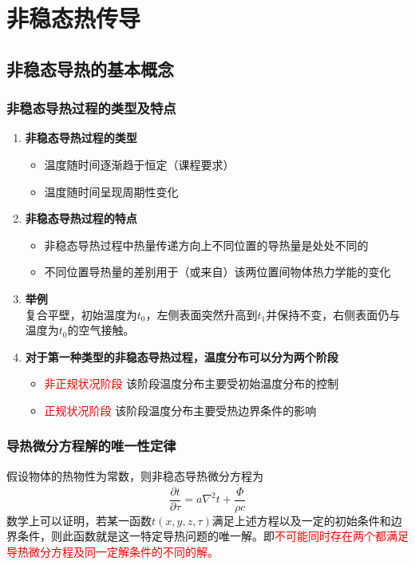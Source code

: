 \chapter{非稳态热传导}
\thispagestyle{empty}

\section{非稳态导热的基本概念}
\subsection{非稳态导热过程的类型及特点
}

\begin{enumerate}[1. ]
	\item \textbf{非稳态导热过程的类型}
	\begin{itemize}
		\item 温度随时间逐渐趋于恒定（课程要求）
		\item 温度随时间呈现周期性变化
	\end{itemize}
	
	\item \textbf{非稳态导热过程的特点}
	\begin{itemize}
		\item 非稳态导热过程中热量传递方向上不同位置的导热量是处处不同的
		\item 不同位置导热量的差别用于（或来自）该两位置间物体热力学能的变化
	
	\end{itemize}

	\item \textbf{举例}\\
	\hspace*{2em} 复合平壁，初始温度为$t_0$，左侧表面突然升高到$t_1$并保持不变，右侧表面仍与温度为$t_0$的空气接触。
	
	\item \textbf{对于第一种类型的非稳态导热过程，温度分布可以分为两个阶段}
	\begin{itemize}
		\item \textcolor{red}{非正规状况阶段} \quad 
该阶段温度分布主要受初始温度分布的控制
		\item \textcolor{red}{正规状况阶段} \quad  该阶段温度分布主要受热边界条件的影响
	\end{itemize}
\end{enumerate}

\subsection{导热微分方程解的唯一性定律}
假设物体的热物性为常数，则非稳态导热微分方程为
\begin{equation}
	\dfrac{\partial t}{\partial \tau} = a \nabla^2 t + \dfrac{\dot{\varPhi}}{\rho c}
\end{equation}
数学上可以证明，若某一函数$t(x,y,z,\tau)$满足上述方程以及一定的初始条件和边界条件，则此函数就是这一特定导热问题的唯一解。即\textcolor{red}{不可能同时存在两个都满足导热微分方程及同一定解条件的不同的解。}

